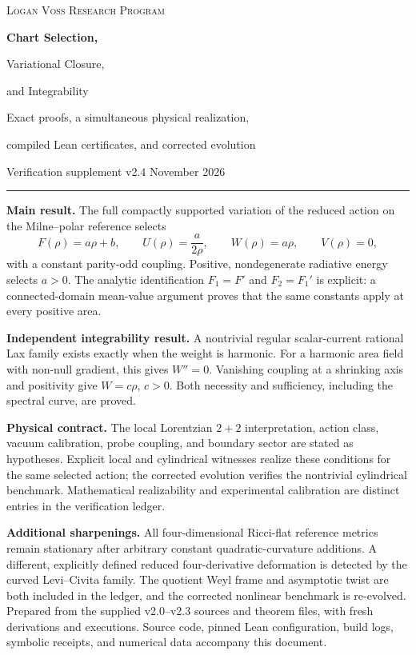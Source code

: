 \documentclass[11pt]{article}
\begin{document}
\hypersetup{pageanchor=false}
\begin{titlepage}
\vspace*{10mm}
{\small\scshape Logan Voss Research Program}\par
\vspace{8mm}
{\Huge\bfseries Chart Selection,\par Variational Closure,\par and Integrability}\par
\vspace{6mm}
{\Large Exact proofs, a simultaneous physical realization,\par compiled Lean certificates, and corrected evolution}\par
\vspace{10mm}
{\large Verification supplement v2.4  November 2026}\par
\vspace{9mm}
\hrule\vspace{5mm}
\textbf{Main result.} The full compactly supported variation of the reduced action on the Milne--polar reference selects
\[
 F(\rho)=a\rho+b,\qquad U(\rho)=\frac{a}{2\rho},\qquad
 W(\rho)=a\rho,\qquad V(\rho)=0,
\]
with a constant parity-odd coupling. Positive, nondegenerate radiative energy selects $a>0$. The analytic identification $F_1=F'$ and $F_2=F_1'$ is explicit: a connected-domain mean-value argument proves that the same constants apply at every positive area.

\textbf{Independent integrability result.} A nontrivial regular scalar-current rational Lax family exists exactly when the weight is harmonic. For a harmonic area field with non-null gradient, this gives $W''=0$. Vanishing coupling at a shrinking axis and positivity give $W=c\rho$, $c>0$. Both necessity and sufficiency, including the spectral curve, are proved.

\textbf{Physical contract.} The local Lorentzian $2+2$ interpretation, action class, vacuum calibration, probe coupling, and boundary sector are stated as hypotheses. Explicit local and cylindrical witnesses realize these conditions for the same selected action; the corrected evolution verifies the nontrivial cylindrical benchmark. Mathematical realizability and experimental calibration are distinct entries in the verification ledger.

\textbf{Additional sharpenings.} All four-dimensional Ricci-flat reference metrics remain stationary after arbitrary constant quadratic-curvature additions. A different, explicitly defined reduced four-derivative deformation is detected by the curved Levi--Civita family. The quotient Weyl frame and asymptotic twist are both included in the ledger, and the corrected nonlinear benchmark is re-evolved.
\vfill
{\small Prepared from the supplied v2.0--v2.3 sources and theorem files, with fresh derivations and executions. Source code, pinned Lean configuration, build logs, symbolic receipts, and numerical data accompany this document.}
\end{titlepage}
\hypersetup{pageanchor=true}
\end{document}
